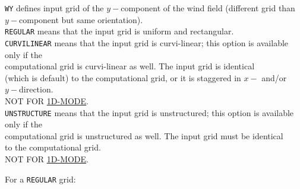 \documentclass[12pt]{book}
\begin{document}
\begin{tabbing}
{\tt WY}            \> defines input grid of the $y-$component of the wind field (different grid than\+\\
                       $y-$component but same orientation).\-\\
{\tt REGULAR}       \> means that the input grid is uniform and rectangular.\\
{\tt CURVILINEAR}   \> means that the input grid is curvi-linear; this option is available only if the\+\\
                       computational grid is curvi-linear as well. The input grid is identical\\
                       (which is default) to the computational grid, or it is staggered in $x-$ and/or\\
                       $y-$direction.\\
                       NOT FOR \underline{1D-MODE}.\-\\
{\tt UNSTRUCTURE}   \> means that the input grid is unstructured; this option is available only if the\+\\
                       computational grid is unstructured as well. The input grid must be identical\\
                       to the computational grid.\\
                       NOT FOR \underline{1D-MODE}.\-\\
\end{tabbing}
For a {\tt REGULAR} grid:
\end{document}
